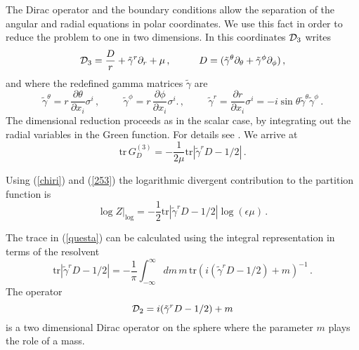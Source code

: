 \documentclass[a4paper]{article}
\begin{document}
\noindent The Dirac operator and the boundary conditions allow the separation of the angular and radial equations in polar coordinates. We use this fact in order to reduce the problem to one in two dimensions. 
In this coordinates ${\cal D}_3$ writes
\begin{equation}
	{\cal D}_3=\frac{D}{r}+\tilde{\gamma}^r\partial_r+\mu\,,
\hspace{1cm} D=(\tilde{\gamma}^{\theta}\partial_{\theta}+\tilde{\gamma}^{\phi}\partial_{\phi})\,,
\label{253}\end{equation}
and where the redefined gamma matrices $\tilde{\gamma}$ are 
\begin{equation}
\tilde{\gamma}^{\theta}=r\, \frac{\partial\theta}{\partial x_i} \sigma^i \,,\hspace{1cm}
\tilde{\gamma}^{\phi}=r\, \frac{\partial\phi}{\partial x_i} \sigma^i.\,,\hspace{1cm}
\tilde{\gamma}^{r}=\frac{\partial r}{\partial x_i} \sigma^i=-i\sin\theta\tilde{\gamma}^{\theta}\tilde{\gamma}^{\phi}\,.
\end{equation}
The dimensional reduction proceeds as in the scalar case, by integrating out the radial variables in the Green function. For details see \cite{log1}. We arrive at
\begin{equation}
\textrm{tr} \, G^{(3)}_D=-\frac{1}{2 \mu} \textrm{tr}\left|\tilde{\gamma}^rD-1/2\right|\,.\label{qwqw}
\end{equation}

Using (\ref{chiri}) and (\ref{253}) the logarithmic divergent contribution to the partition function  is
\begin{equation}
\log Z|_{\log}=-\frac{1}{2} \textrm{tr}\left|\tilde{\gamma}^rD-1/2\right| \log (\epsilon \mu)\,.\label{questa}
\end{equation}

The trace in (\ref{questa}) can be calculated using the integral representation in terms of the resolvent \cite{seeley} 
\begin{equation}
\textrm{tr}\left|\tilde{\gamma}^r D-1/2\right|=-\frac{1}{\pi}\int^{\infty}_{-\infty}dm\,m\, \textrm{tr}(i(\tilde{\gamma}^rD-1/2)+m)^{-1}\,.\label{refe1}
\end{equation}
The operator 
\begin{equation}
{\cal D}_2=i(\tilde{\gamma}^r D-1/2)+ m\label{dira}
\end{equation}
 is a two dimensional Dirac operator on the sphere where the parameter $m$ plays the role of a mass.
\end{document}
